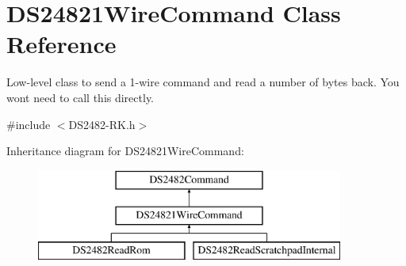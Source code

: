 \hypertarget{class_d_s24821_wire_command}{}\section{D\+S24821\+Wire\+Command Class Reference}
\label{class_d_s24821_wire_command}


Low-\/level class to send a 1-\/wire command and read a number of bytes back. You won\textquotesingle{}t need to call this directly.  




{\ttfamily \#include $<$D\+S2482-\/\+R\+K.\+h$>$}

Inheritance diagram for D\+S24821\+Wire\+Command\+:\begin{figure}[H]
\begin{center}
\leavevmode
\includegraphics[height=3.000000cm]{class_d_s24821_wire_command}
\end{center}
\end{figure}

